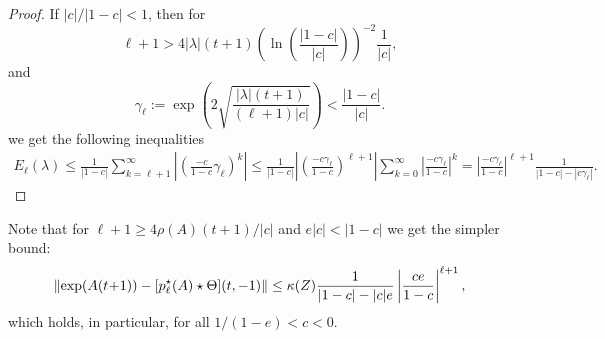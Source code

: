\documentclass[final,1p,times,number]{elsarticle}
\theoremstyle{plain}%
\begin{document}
\begin{proof}
If \(|c|/|1-c| < 1\), then for
\[\ell+1 > 4|\lambda|(t+1) \left(\ln\left(\frac{|1-c|}{|c|}\right)\right)^{-2}\frac{1}{|c|},\] 
and
\[ \gamma_\ell :=\exp\left(2\sqrt{\frac{|\lambda|(t+1)}{(\ell+1)|c|}}\right) < \frac{|1-c|}{|c|}. \]
we get the following inequalities
\begin{align*}
    E_\ell(\lambda) \leq \frac{1}{|1-c|} \sum_{k={\ell+1}}^\infty \left| \left(\frac{-c}{1-c}  \gamma_\ell \right)^k\right| \leq \frac{1}{|1-c|}  \left| \left(\frac{-c \gamma_\ell}{1-c}  \right)^{\ell+1}\right| \sum_{k=0}^\infty \left| \frac{-c \gamma_\ell}{1-c} \right|^k = \left|\frac{-c \gamma_\ell}{1-c}  \right|^{\ell+1} \frac{1}{|1-c|-|c\gamma_\ell|}.
\end{align*}
\end{proof}
Note that for $\ell + 1 \geq 4 \rho(A) (t+1) / |c|$ and $e |c| < |1-c|$ we get the simpler bound:
\[
     \left \| \exp(A(t\hspace{-2pt}+\hspace{-2pt}1)) -  [p_\ell^\star(A)\star \Theta](t,-1) \right \| \leq \kappa(Z)  \frac{1}{|1-c|-|c|e}  \left|\frac{c e}{1-c}\right|^{\ell+1}, \]
which holds, in particular, for all \(1/(1-e)<c<0\).
\end{document}
